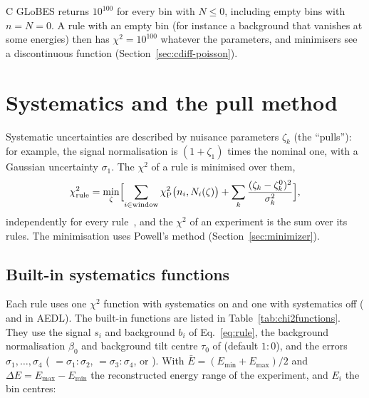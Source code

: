 \begin{cdiff}
C GLoBES returns $10^{100}$ for every bin with $N\le0$, including empty bins
with $n=N=0$. A rule with an empty bin (for instance a background that
vanishes at some energies) then has $\chi^2=10^{100}$ whatever the parameters,
and minimisers see a discontinuous function
(Section~\ref{sec:cdiff-poisson}).
\end{cdiff}

\section{Systematics and the pull method}\label{sec:pull}

Systematic uncertainties are described by nuisance parameters $\zeta_k$ (the
``pulls''): for example, the signal normalisation is $(1+\zeta_1)$ times the
nominal one, with a Gaussian uncertainty $\sigma_1$. The $\chi^2$ of a rule is
minimised over them,
\begin{equation}
\chi^2_\text{rule} = \min_{\zeta}\Bigl[\sum_{i\in\text{window}}\chi^2_\text{P}\bigl(n_i,N_i(\zeta)\bigr)
  + \sum_k\frac{(\zeta_k-\zeta_k^0)^2}{\sigma_k^2}\Bigr],
\label{eq:pull}
\end{equation}
independently for every rule~\cite{Fogli:2002pt}, and the $\chi^2$ of an
experiment is the sum over its rules. The minimisation uses Powell's method
(Section~\ref{sec:minimizer}).

\subsection{Built-in systematics functions}\label{sec:builtin-chi2}

Each rule uses one $\chi^2$ function with systematics on and one with
systematics off ( and  in
AEDL). The built-in functions are listed in Table~\ref{tab:chi2functions}.
They use the signal $s_i$ and background $b_i$ of Eq.~\eqref{eq:rule}, the
background normalisation $\beta_0$ and background tilt centre $\tau_0$ of
 (default $1:0$), and the errors
$\sigma_1,\dots,\sigma_4$ ( $=\sigma_1:\sigma_2$,
 $=\sigma_3:\sigma_4$, or ).
With $\bar E = (E_\text{min}+E_\text{max})/2$ and
$\Delta E = E_\text{max}-E_\text{min}$ the reconstructed energy range of the
experiment, and $E_i$ the bin centres:

